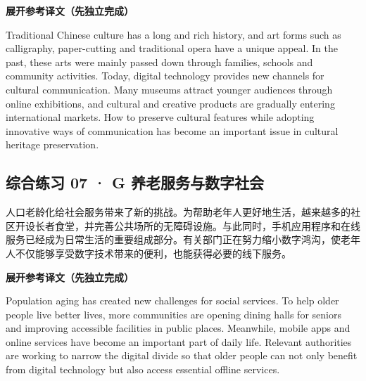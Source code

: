 \documentclass[a4paper,11pt,UTF8,fontset=none]{ctexart}
\begin{document}
\noindent\colorbox{HeadBlue}{\strut {\bfseries 展开参考译文（先独立完成）}}\par\vspace{1pt}

\noindent Traditional Chinese culture has a long and rich history, and art forms such as calligraphy, paper-cutting and traditional opera have a unique appeal. In the past, these arts were mainly passed down through families, schools and community activities. Today, digital technology provides new channels for cultural communication. Many museums attract younger audiences through online exhibitions, and cultural and creative products are gradually entering international markets. How to preserve cultural features while adopting innovative ways of communication has become an important issue in cultural heritage preservation.\par

\vspace{4pt}

\subsection{综合练习 07 · G 养老服务与数字社会}

\par

\noindent 人口老龄化给社会服务带来了新的挑战。为帮助老年人更好地生活，越来越多的社区开设长者食堂，并完善公共场所的无障碍设施。与此同时，手机应用程序和在线服务已经成为日常生活的重要组成部分。有关部门正在努力缩小数字鸿沟，使老年人不仅能够享受数字技术带来的便利，也能获得必要的线下服务。\par

\noindent\colorbox{HeadBlue}{\strut {\bfseries 展开参考译文（先独立完成）}}\par\vspace{1pt}

\noindent Population aging has created new challenges for social services. To help older people live better lives, more communities are opening dining halls for seniors and improving accessible facilities in public places. Meanwhile, mobile apps and online services have become an important part of daily life. Relevant authorities are working to narrow the digital divide so that older people can not only benefit from digital technology but also access essential offline services.\par
\end{document}

